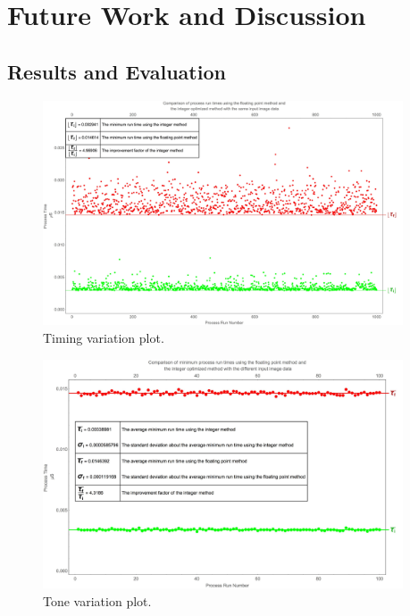 
\chapter{Future Work and Discussion}

\ifpdf
    \graphicspath{{Chapter5/Figs/Raster/}{Chapter5/Figs/PDF/}{Chapter5/Figs/}}
\else
    \graphicspath{{Chapter5/Figs/Vector/}{Chapter5/Figs/}}
\fi
\section{Results and Evaluation}\label{sec:ResultsAndEvaluation}

\begin{figure}[h!]
  \centering
    \includegraphics[width=0.95\textwidth]{Chapter5/Figs/Timing_Variation_Plot.jpg}
    \caption{Timing variation plot.}\label{fig:TimingVariationPlot}
\end{figure}

\begin{figure}[h!]
  \centering
    \includegraphics[width=0.95\textwidth]{Chapter5/Figs/Tone_Variation_Plot.jpg}
    \caption{Tone variation plot.}\label{fig:ToneVariationPlot}
\end{figure}

